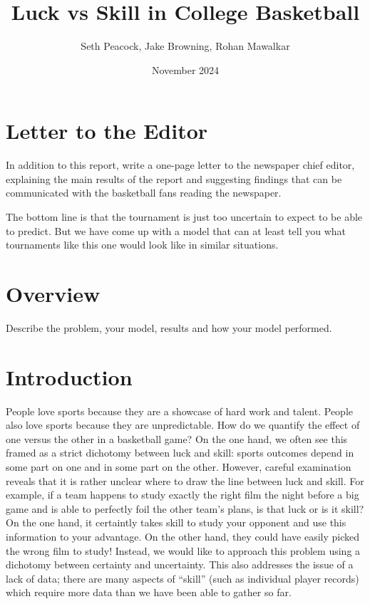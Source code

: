 \documentclass{article}
\title{Luck vs Skill in College Basketball}
\author{Seth Peacock, Jake Browning, Rohan Mawalkar}
\date{November 2024}
\begin{document}
\maketitle

\newpage

\section{Letter to the Editor}
In addition to this report, write a one-page letter to the newspaper chief editor, explaining the main results of
the report and suggesting findings that can be communicated with the basketball fans reading the newspaper.

The bottom line is that the tournament is just too uncertain to expect to be able to predict. But we have come up with a model that can at least tell you what tournaments like this one would look like in similar situations.

\newpage

\section{Overview}
Describe the problem, your model, results and how your model performed.

\newpage

\section{Introduction}

People love sports because they are a showcase of hard work and talent. People also love sports because they are unpredictable. How do we quantify the effect of one versus the other in a basketball game? On the one hand, we often see this framed as a strict dichotomy between luck and skill: sports outcomes depend in some part on one and in some part on the other. However, careful examination reveals that it is rather unclear where to draw the line between luck and skill. For example, if a team happens to study exactly the right film the night before a big game and is able to perfectly foil the other team's plans, is that luck or is it skill? On the one hand, it certaintly takes skill to study your opponent and use this information to your advantage. On the other hand, they could have easily picked the wrong film to study! Instead, we would like to approach this problem using a dichotomy between certainty and uncertainty.  This also addresses the issue of a lack of data; there are many aspects of ``skill'' (such as individual player records) which require more data than we have been able to gather so far.
\end{document}
